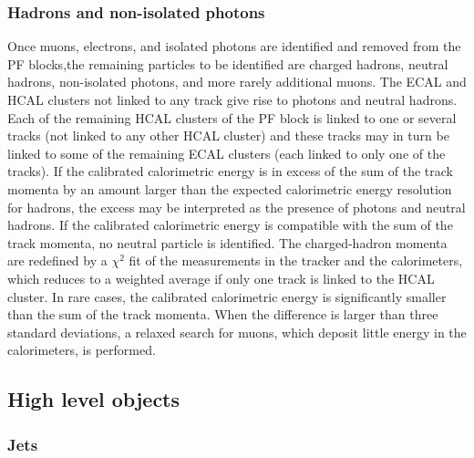 \subsubsection{Hadrons and non-isolated photons} 
Once muons, electrons, and isolated photons are identified and removed from the PF blocks,the remaining particles to be identified are charged hadrons, neutral hadrons, non-isolated photons, and more rarely additional muons. The ECAL and HCAL clusters not linked to any track give rise to photons and neutral hadrons. Each of the remaining HCAL clusters of the PF block is linked to one or several tracks (not linked to any other HCAL cluster) and these tracks may in turn be linked to some of the remaining ECAL clusters (each linked to only one of the tracks). If the calibrated calorimetric energy is in excess of the sum of the track momenta by an amount larger than the expected calorimetric energy resolution for hadrons, the excess may be interpreted as the presence of photons and neutral hadrons. If the calibrated calorimetric energy is compatible with the sum of the track momenta, no neutral particle is identified.  The charged-hadron momenta are redefined by a $\chi^2$ fit of the measurements in the tracker and the calorimeters,  which reduces to a weighted average if only one track is linked to the HCAL cluster. In  rare  cases,  the  calibrated  calorimetric  energy  is  significantly  smaller  than  the  sum  of  the track momenta. When the difference is larger than three standard deviations, a relaxed search for muons,  which deposit little energy in the calorimeters,  is performed.


\subsection{High level objects}

\subsubsection{Jets}
\label{sec:jet_clustering}

